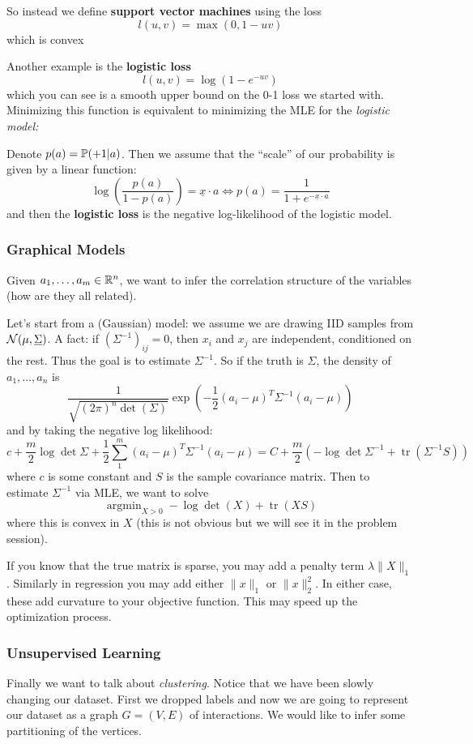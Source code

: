 \documentclass[12pt]{article}
\begin{document}
So instead we define \textbf{support vector machines} using the loss 
\[l(u,v)=\max(0,1-uv)\]
which is convex 

Another example is the \textbf{logistic loss}
\[l(u,v)=\log(1-e^{-uv})\]
which you can see is a smooth upper bound on the 0-1 loss we started with. Minimizing this function is equivalent to minimizing the MLE for the \textit{logistic model:}

Denote $p(a)=\mathbb{P}(+1|a)$. Then we assume that the ``scale'' of our probability is given by a linear function:
\[\log\left(\frac{p(a)}{1-p(a)}\right)=\underline x\cdot a\Leftrightarrow p(a)=\frac{1}{1+e^{-\underline{x}\cdot a}}\]
and then the \textbf{logistic loss} is the negative log-likelihood of the logistic model.

\subsubsection{Graphical Models}
Given $a_1,\dots,a_m\in\mathbb{R}^n$, we want to infer the correlation structure of the variables (how are they all related).

Let's start from a (Gaussian) model: we assume we are drawing IID samples from $\mathcal{N}(\mu,\underline\Sigma)$. A fact: if $(\Sigma^{-1})_{ij}=0$, then $x_i$ and $x_j$ are independent, conditioned on the rest.
Thus the goal is to estimate $\Sigma^{-1}$. So if the truth is $\Sigma$, the density of $a_1,\dots,a_n$ is 
\[\frac{1}{\sqrt{(2\pi)^n\det(\Sigma)}}\exp(-\frac{1}{2}(a_i-\mu)^T\Sigma^{-1}(a_i-\mu))\]
and by taking the negative log likelihood:
\[c+\frac{m}{2}\log\det\Sigma+\frac{1}{2}\sum_1^m(a_i-\mu)^T\Sigma^{-1}(a_i-\mu)=C+\frac{m}{2}\left(-\log\det\Sigma^{-1}+\operatorname{tr}(\Sigma^{-1}S)\right)\]
where $c$ is some constant and $S$ is the sample covariance matrix. Then to estimate $\Sigma^{-1}$ via MLE, we want to solve 
\[\operatorname{argmin}_{X>0}-\log\det(X)+\operatorname{tr}(XS)\]
where this is convex in $X$ (this is not obvious but we will see it in the problem session).

If you know that the true matrix is sparse, you may add a penalty term $\lambda \|X\|_1$. Similarly in regression you may add either $\|x\|_1$ or $\|x\|_2^2$.
In either case, these add curvature to your objective function. This may speed up the optimization process.

\subsubsection{Unsupervised Learning}
Finally we want to talk about \textit{clustering}. Notice that we have been slowly changing our dataset. First we dropped labels and now we are going to represent our dataset as a graph $G=(V,E)$ of interactions.
We would like to infer some partitioning of the vertices.
\end{document}
